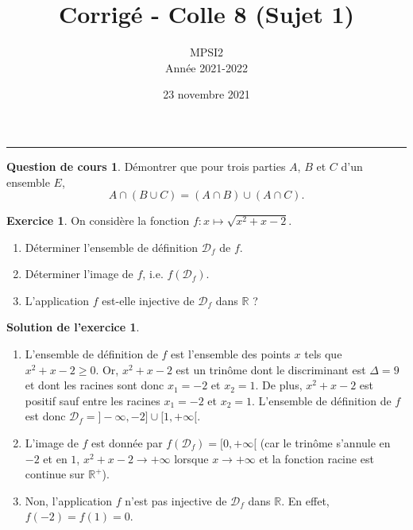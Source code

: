 \documentclass[a4paper, 11pt,openany]{article}%
\title{Corrigé - Colle 8 (Sujet 1)}
\author{MPSI2\\
Année 2021-2022}
\date{23 novembre 2021}
\theoremstyle{plain}
\theoremstyle{definition}
\newtheorem{cours}{Question de cours}
\newtheorem{exo}{Exercice}
\newtheorem{sol}{Solution de l'exercice}
\theoremstyle{remark}
\newcommand{\R}{\mathbb{R}}
\newcommand{\calD}{\mathcal{D}}
\begin{document}
   \maketitle
      \rule{\linewidth}{0.5mm}


\begin{cours}
Démontrer que pour trois parties $A$, $B$ et $C$ d'un ensemble $E$,
\[ A \cap(B \cup C) = (A \cap B) \cup (A \cap C).\]
\end{cours}

\begin{exo}
On considère la fonction 
$ f : x \mapsto \sqrt{x^2 + x - 2}$.
\begin{enumerate}
\item Déterminer l'ensemble de définition $\calD_f$ de $f$.
\item Déterminer l'image de $f$, i.e. $f(\calD_f)$.
\item L'application $f$ est-elle injective de $\calD_f$ dans $\R$ ?
\end{enumerate}
\end{exo}

\begin{sol}
\begin{enumerate}
\item L'ensemble de définition de $f$ est l'ensemble des points $x$ tels que $x^2 + x -2 \geqslant 0$. Or, $x^2 + x -2$ est un trinôme dont le discriminant est $\Delta = 9$ et dont les racines sont donc $x_1 = -2$ et $x_2 =1$. De plus, $x^2 +x -2$ est positif sauf entre les racines $x_1 = -2$ et $x_2= 1$. L'ensemble de définition de $f$ est donc $\calD_f = ]-\infty,-2] \cup [1, +\infty[$.
\item L'image de $f$ est donnée par $f(\calD_f) = [0,+\infty[$ (car le trinôme s'annule en $-2$ et en $1$, $x^2+x-2 \to + \infty$ lorsque $x \to + \infty$ et la fonction racine est continue sur $\R^+$).
\item Non, l'application $f$ n'est pas injective de $\calD_f$ dans $\R$. En effet, $f(-2) =  f(1)= 0$.
\end{enumerate}
\end{sol}
\end{document}
